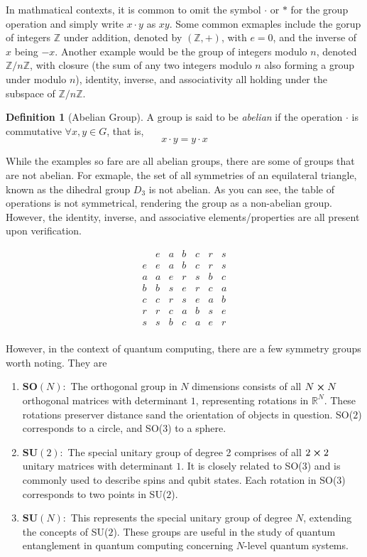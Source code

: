 \documentclass[12pt]{article}
\theoremstyle{definition}
\newtheorem{definition}[theorem]{Definition}
\begin{document}
In mathmatical contexts, it is common to omit the symbol $\cdot$ or $*$ for the group operation and simply write $x \cdot y$ as $xy$. Some common exmaples include the gorup of integers $\mathbb{Z}$ under addition, denoted by $(\mathbb{Z}, +)$, with $e = 0$, and the inverse of $x$ being $-x$. Another example would be the group of integers modulo $n$, denoted $\mathbb{Z}/n\mathbb{Z}$, with closure (the sum of any two integers modulo $n$ also forming a group under modulo $n$), identity, inverse, and associativity all holding under the subspace of $\mathbb{Z}/n\mathbb{Z}$.

\begin{definition}[Abelian Group]
   A group is said to be \textit{abelian} if the operation $\cdot$ is commutative $\forall x, y \in G$, that is, $$x \cdot y = y \cdot x$$ 
\end{definition}


While the examples so fare are all abelian groups, there are some of groups that are not abelian. For exmaple, the set of all symmetries of an equilateral triangle, known as the dihedral group $D_3$ is not abelian. As you can see, the table of operations is not symmetrical, rendering the group as a non-abelian group. However, the identity, inverse, and associative elements/properties are all present upon verification. 


\[
\begin{array}{c|cccccc}
   & e & a & b & c & r & s \\
\hline
e & e & a & b & c & r & s \\
a & a & e & r & s & b & c \\
b & b & s & e & r & c & a \\
c & c & r & s & e & a & b \\
r & r & c & a & b & s & e \\
s & s & b & c & a & e & r \\
\end{array}
\]



However, in the context of quantum computing, there are a few symmetry groups worth noting. They are

\begin{enumerate}
    \item $\mathbf{SO}(N):$ The orthogonal group in $N$ dimensions consists of all $N \cross N$ orthogonal matrices with determinant $1$, representing rotations in $\mathbb{R}^N$. These rotations preserver distance sand the orientation of objects in question. SO($2$) corresponds to a circle, and SO($3$) to a sphere. 
    \item $\mathbf{SU}(2):$ The special unitary group of degree 2 comprises of all $2 \cross 2$ unitary matrices with determinant $1$. It is closely related to SO($3$) and is commonly used to describe spins and qubit states. Each rotation in SO($3$) corresponds to two points in SU($2$). 
    \item $\mathbf{SU}(N):$ This represents the special unitary group of degree $N$, extending the concepts of SU($2$). These groups are useful in the study of quantum entanglement in quantum computing concerning $N$-level quantum systems. 
\end{enumerate}
\end{document}
